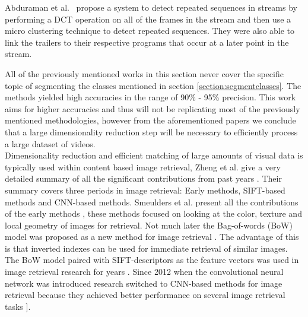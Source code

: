 \documentclass{article}
\begin{document}
Abduraman et al.\ \cite{abduraman2011unsupervised} propose a system to detect repeated sequences in streams by performing a DCT operation on all of the frames in the stream and then use a micro clustering technique to detect repeated sequences. They were also able to link the trailers to their respective programs that occur at a later point in the stream.

All of the previously mentioned works in this section never cover the specific topic of segmenting the classes mentioned in section \ref{section:segmentclasses}. The methods yielded high accuracies in the range of 90\% - 95\% precision. This work aims for higher accuracies and thus will not be replicating most of the previously mentioned methodologies, however from the aforementioned papers we conclude that a large dimensionality reduction step will be necessary to efficiently process a large dataset of videos.
\\

Dimensionality reduction and efficient matching of large amounts of visual data is typically used within content based image retrieval, Zheng et al. give a very detailed summary of all the significant contributions from past years \cite{zheng2018sift}. Their summary covers three periods in image retrieval: Early methods, SIFT-based methods and CNN-based methods. Smeulders et al. present all the contributions of the early methods \cite{smeulders2000content}, these methods focused on looking at the color, texture and local geometry of images for retrieval. Not much later the Bag-of-words (BoW) model was proposed as a new method for image retrieval \cite{sivic2003video}. The advantage of this is that inverted indexes can be used for immediate retrieval of similar images. The BoW model paired with SIFT-descriptors \cite{lowe2004distinctive} as the feature vectors was used in image retrieval research for years \cite{nister2006scalable}\cite{philbin2007object}\cite{jegou2008hamming}\cite{jegou2010aggregating}\cite{jegou2012aggregating}. Since 2012 when the convolutional neural network was introduced \cite{krizhevsky2012imagenet} research switched to CNN-based methods for image retrieval because they achieved better performance on several image retrieval tasks	 \cite{babenko2014neural}]\cite{yue2015exploiting}\cite{tolias2015particular}.


\iffalse
\cite{li2000automatic} %

\cite{lienhart1997detection} %
\cite{covell2006advertisement} %
\end{document}
